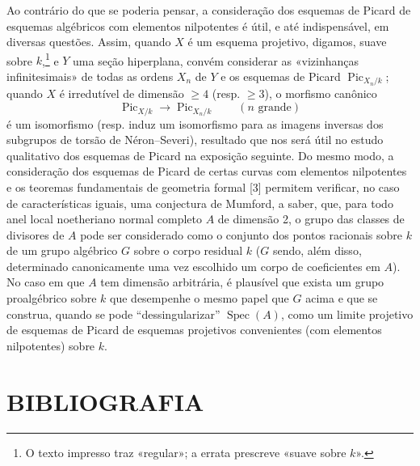  Ao contrário do que se poderia pensar, a consideração
dos esquemas de Picard de esquemas algébricos com elementos nilpotentes é útil,
e até indispensável, em diversas questões. Assim, quando $X$ é um esquema
projetivo, digamos, suave sobre $k$,\footnote{O texto impresso traz «regular»;
a errata prescreve «suave sobre $k$».} e $Y$ uma seção hiperplana, convém
considerar as «vizinhanças infinitesimais» de todas as ordens $X_n$ de $Y$ e os
esquemas de Picard $\operatorname{Pic}_{X_n/k}$; quando $X$ é irredutível de
dimensão $\geq4$ (resp. $\geq3$), o morfismo canônico
\[
\operatorname{Pic}_{X/k}\longrightarrow\operatorname{Pic}_{X_n/k}
\qquad(n\text{ grande})
\]
é um isomorfismo (resp. induz um isomorfismo para as imagens inversas dos
subgrupos de torsão de Néron--Severi), resultado que nos será útil no estudo
qualitativo dos esquemas de Picard na exposição seguinte. Do mesmo modo, a
consideração dos esquemas de Picard de certas curvas com elementos nilpotentes
e os teoremas fundamentais de geometria formal [3] permitem verificar, no caso
de características iguais, uma conjectura de Mumford, a saber, que, para todo
anel local noetheriano normal completo $A$ de dimensão 2, o grupo das classes
de divisores de $A$ pode ser considerado como o conjunto dos pontos racionais
sobre $k$ de um
grupo algébrico $G$ sobre o corpo residual $k$ ($G$ sendo, além disso,
determinado canonicamente uma vez escolhido um corpo de coeficientes em $A$).
No caso em que $A$ tem dimensão arbitrária, é plausível que exista um grupo
proalgébrico sobre $k$ que desempenhe o mesmo papel que $G$ acima e que se
construa, quando se pode ``dessingularizar'' $\operatorname{Spec}(A)$, como um
limite projetivo de esquemas de Picard de esquemas projetivos convenientes (com
elementos nilpotentes) sobre $k$.

\section*{BIBLIOGRAFIA}

